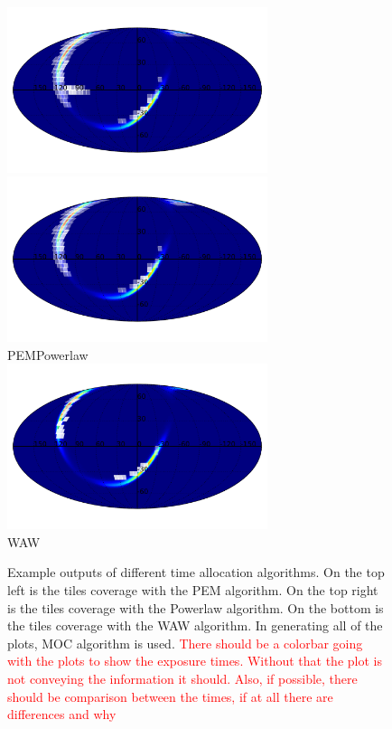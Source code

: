 \documentclass[twocolumn]{aastex62}
\begin{document}
\begin{figure}
    \centering
    \includegraphics[width=3in]{plots/coverage_pem.pdf}
    \includegraphics[width=3in]{plots/coverage_powerlaw.pdf}\\
    PEM\hspace{2.6in}Powerlaw\\
    \includegraphics[width=3in]{plots/coverage_waw.pdf}\\
    WAW
    \caption{Example outputs of different time allocation algorithms. On the top left is the tiles coverage with the PEM algorithm. On the top right is the tiles coverage with the Powerlaw algorithm. On the bottom is the tiles coverage with the WAW algorithm. In generating all of the plots, MOC algorithm is used.
	\textcolor{red}{There should be a colorbar going with the plots to show the exposure times. 
	Without that the plot is not conveying the information it should. Also, if possible, there 
	should be comparison between the times, if at all there are differences and why}
    }
    \label{fig:timealloc}
\end{figure}
\end{document}
